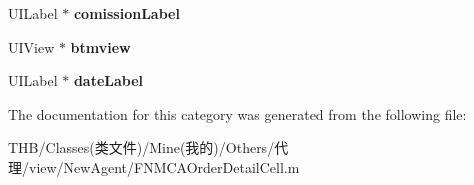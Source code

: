 \begin{DoxyCompactItemize}
\mbox{\label{category_f_n_m_c_a_order_detail_cell_07_08_aebc25e09d3121c982d578d4c8cc563e0}} 
U\+I\+Label $\ast$ {\bfseries comission\+Label}
\item 
\mbox{\label{category_f_n_m_c_a_order_detail_cell_07_08_acededbb399bd27f02e11f28a3b467521}} 
U\+I\+View $\ast$ {\bfseries btmview}
\item 
\mbox{\label{category_f_n_m_c_a_order_detail_cell_07_08_a5fa1905e45506500ef6d66635e19ff46}} 
U\+I\+Label $\ast$ {\bfseries date\+Label}
\end{DoxyCompactItemize}


The documentation for this category was generated from the following file\+:\begin{DoxyCompactItemize}
\item 
T\+H\+B/\+Classes(类文件)/\+Mine(我的)/\+Others/代理/view/\+New\+Agent/F\+N\+M\+C\+A\+Order\+Detail\+Cell.\+m\end{DoxyCompactItemize}
